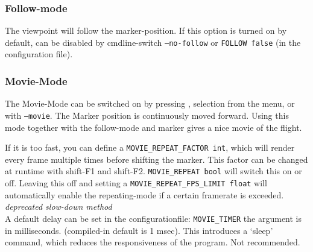 \subsubsection{Follow-mode}

The viewpoint will follow the marker-position. If this option is turned on by
default, can be disabled by cmdline-switch \texttt{--no-follow} or \texttt{FOLLOW false} (in  the configuration file).


\subsubsection{Movie-Mode}
\label{movie}
The Movie-Mode can be switched on by pressing , selection from the menu, or with \texttt{--movie}.
The Marker position is continuously moved forward.
Using this mode together with the follow-mode and marker gives a nice movie of the flight.

If it is too fast, you can define a \texttt{MOVIE\_REPEAT\_FACTOR int}, which will render every frame multiple times before shifting the marker. This factor can be changed at runtime with shift-F1 and shift-F2.
\texttt{MOVIE\_REPEAT bool} will switch this on or off. Leaving this off and setting a \texttt{MOVIE\_REPEAT\_FPS\_LIMIT float} will  automatically enable the repeating-mode if a certain framerate is exceeded. \\

\emph{deprecated slow-down method} \\
A default delay can be set in the configurationfile:
\texttt{MOVIE\_TIMER} the argument is in milliseconds. (compiled-in default is 1 msec).
This introduces a `sleep' command, which reduces the responsiveness of the program. Not recommended.

